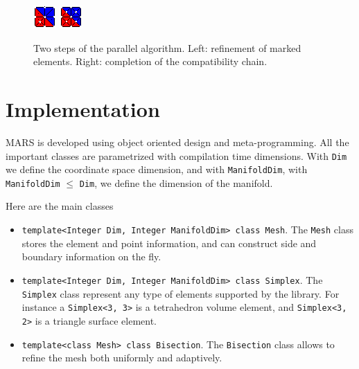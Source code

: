 \documentclass{article}
\begin{document}
\begin{figure} \centering \footnotesize
	\includegraphics[width=0.48\linewidth]{figures/partial} \hfill
	\includegraphics[width=0.48\linewidth]{figures/complete} 
	\caption{Two steps of the parallel algorithm. Left: refinement of marked elements. Right: completion of the compatibility chain.}
	\label{fig:par_algo}
\end{figure}

\section{Implementation}
MARS is developed using object oriented design and meta-programming. All the important classes are parametrized with compilation time dimensions. With {\tt Dim} we define the coordinate space dimension, and with {\tt ManifoldDim}, with  {\tt ManifoldDim} $\leq$ {\tt Dim}, we define the dimension of the manifold. 

Here are the main classes

\begin{itemize}
	\item {\tt template<Integer Dim, Integer ManifoldDim> class Mesh}. The {\tt Mesh} class stores the element and point information, and can construct side and boundary information on the fly.
	\item {\tt template<Integer Dim, Integer ManifoldDim> class Simplex}. The {\tt Simplex} class represent any type of elements supported by the library. For instance a {\tt Simplex<3, 3>} is a tetrahedron volume element, and {\tt Simplex<3, 2>} is a triangle surface element.
	\item {\tt template<class Mesh> class Bisection}. The {\tt Bisection} class
	allows to refine the mesh both uniformly and adaptively.
\end{itemize}
\end{document}
